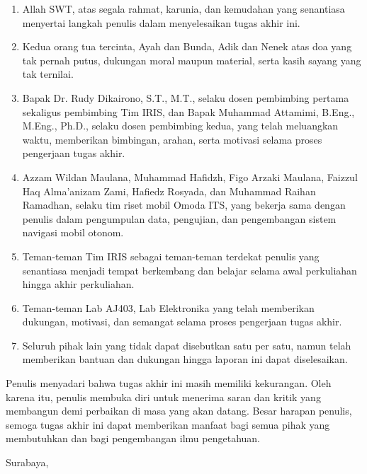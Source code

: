 \begin{enumerate}
\item Allah SWT, atas segala rahmat, karunia, dan kemudahan yang
      senantiasa menyertai langkah penulis dalam menyelesaikan
      tugas akhir ini.

\item Kedua orang tua tercinta, Ayah dan Bunda, Adik dan Nenek atas doa yang tak pernah putus, dukungan moral
      maupun material, serta kasih sayang yang tak ternilai.

\item Bapak Dr. Rudy Dikairono, S.T., M.T., selaku dosen pembimbing
      pertama sekaligus pembimbing Tim IRIS, dan Bapak Muhammad Attamimi, B.Eng., M.Eng., Ph.D.,
      selaku dosen pembimbing kedua, yang telah meluangkan waktu,
      memberikan bimbingan, arahan, serta motivasi selama proses
      pengerjaan tugas akhir.

\item \begin{sloppypar}Azzam Wildan Maulana, Muhammad Hafidzh, Figo Arzaki Maulana, Faizzul Haq Alma'anizam Zami, Hafiedz Rosyada, dan Muhammad Raihan Ramadhan,
      selaku tim riset mobil Omoda ITS, yang bekerja sama dengan penulis dalam pengumpulan data, pengujian, dan
      pengembangan sistem navigasi mobil otonom.\end{sloppypar}

\item Teman-teman Tim IRIS sebagai teman-teman terdekat penulis yang
      senantiasa menjadi tempat berkembang dan belajar selama awal perkuliahan hingga
      akhir perkuliahan.

\item Teman-teman Lab AJ403, Lab Elektronika yang telah memberikan dukungan, motivasi, dan semangat selama proses pengerjaan tugas akhir.

\item Seluruh pihak lain yang tidak dapat disebutkan satu per satu,
      namun telah memberikan bantuan dan dukungan hingga laporan ini
      dapat diselesaikan.
\end{enumerate}

Penulis menyadari bahwa tugas akhir ini masih memiliki kekurangan.
Oleh karena itu, penulis membuka diri untuk menerima saran dan kritik
yang membangun demi perbaikan di masa yang akan datang. Besar harapan
penulis, semoga tugas akhir ini dapat memberikan manfaat bagi semua
pihak yang membutuhkan dan bagi pengembangan ilmu pengetahuan.

\vspace{2ex}

\begin{flushright}
Surabaya, \MONTH{} \the\year

\vspace{2ex}

\name{}
\end{flushright}
